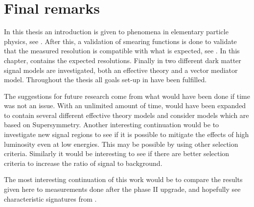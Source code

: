 \chapter{Final remarks}\label{cha:res}
In this thesis an introduction is given to phenomena in elementary particle 
\\physics, see . After this, a validation of smearing functions is done to validate that the measured resolution is compatible with what is expected, see . In this chapter,  contains the expected resolutions. Finally in  two different dark matter signal models are investigated, both an effective theory and a vector mediator model. Throughout the thesis all goals set-up in  have been fulfilled.

The suggestions for future research come from what would have been done if time was not an issue. With an unlimited amount of time,  would have been expanded to contain several different effective theory models and consider models which are based on Supersymmetry. Another interesting continuation would be to investigate new signal regions to see if it is possible to mitigate the effects of high luminosity even at low energies. This may be possible by using other selection criteria. Similarly it would be interesting to see if there are better selection criteria to increase the ratio of signal to background.  

The most interesting continuation of this work would be to compare the results given here to measurements done after the phase II upgrade, and hopefully see characteristic signatures from \abbrWIMPS .